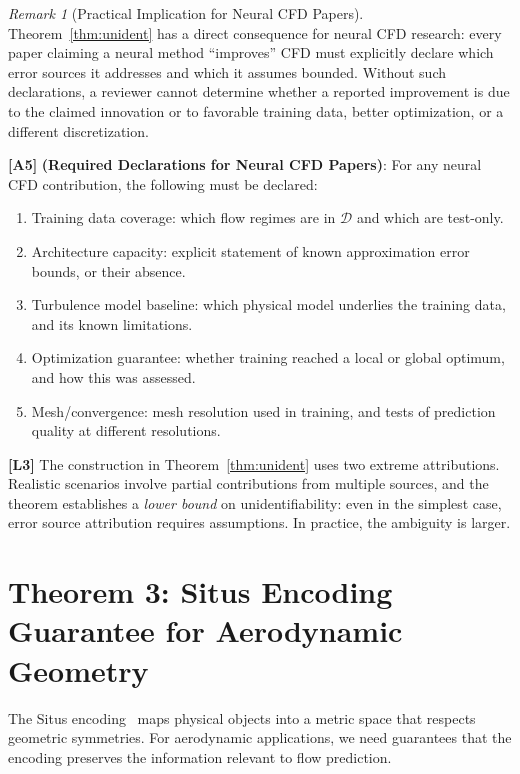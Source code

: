 \documentclass[11pt,a4paper]{article}
\theoremstyle{definition}
\theoremstyle{remark}
\newtheorem{remark}[theorem]{Remark}
\newcommand{\assumptionTag}[1]{\textsf{\textbf{[A#1]}}}
\newcommand{\limitationTag}[1]{\textsf{\textbf{[L#1]}}}
\begin{document}
\begin{remark}[Practical Implication for Neural CFD Papers]
\label{rem:practical}
Theorem~\ref{thm:unident} has a direct consequence for neural CFD research: every paper claiming a neural method ``improves'' CFD must explicitly declare which error sources it addresses and which it assumes bounded.
Without such declarations, a reviewer cannot determine whether a reported improvement is due to the claimed innovation or to favorable training data, better optimization, or a different discretization.

\assumptionTag{5} \textbf{(Required Declarations for Neural CFD Papers)}: For any neural CFD contribution, the following must be declared:
\begin{enumerate}[label=(\roman*)]
    \item Training data coverage: which flow regimes are in $\mathcal{D}$ and which are test-only.
    \item Architecture capacity: explicit statement of known approximation error bounds, or their absence.
    \item Turbulence model baseline: which physical model underlies the training data, and its known limitations.
    \item Optimization guarantee: whether training reached a local or global optimum, and how this was assessed.
    \item Mesh/convergence: mesh resolution used in training, and tests of prediction quality at different resolutions.
\end{enumerate}
\end{remark}

\limitationTag{3} The construction in Theorem~\ref{thm:unident} uses two extreme attributions. Realistic scenarios involve partial contributions from multiple sources, and the theorem establishes a \emph{lower bound} on unidentifiability: even in the simplest case, error source attribution requires assumptions. In practice, the ambiguity is larger.

\section{Theorem 3: Situs Encoding Guarantee for Aerodynamic Geometry}

The Situs encoding~\citep{scx_theory} maps physical objects into a metric space that respects geometric symmetries.
For aerodynamic applications, we need guarantees that the encoding preserves the information relevant to flow prediction.
\end{document}
